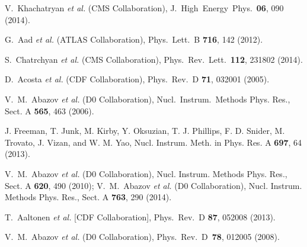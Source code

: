 \documentclass[aps,prl,twocolumn,showpacs,superscriptaddress,groupedaddress]{revtex4}  %
\begin{document}
\begin{thebibliography}{99}
  V.~Khachatryan {\it et al.}  (CMS Collaboration),
   J.\ High\ Energy\ Phys.\ {\bf 06}, 090 (2014).

   G.~Aad {\it et al.}  (ATLAS Collaboration),
  Phys.\ Lett.\ B {\bf 716}, 142 (2012).

  S.~Chatrchyan {\it et al.}  (CMS Collaboration),
  Phys.\ Rev.\ Lett.\  {\bf 112}, 231802 (2014).

  D.~Acosta {\it et al.}  (CDF Collaboration),
  Phys.\ Rev.\ D {\bf 71}, 032001 (2005).

  V.~M.~Abazov {\it et al.}  (D0 Collaboration),
  Nucl.\ Instrum.\ Methods Phys. Res., Sect. A {\bf 565}, 463 (2006).

J. Freeman, T. Junk, M. Kirby, Y. Oksuzian, T. J. Phillips,
F. D. Snider, M. Trovato, J. Vizan, and W. M. Yao,
Nucl. Instrum. Meth. in Phys. Res.
 A {\bf 697}, 64 (2013).

  V.~M.~Abazov {\it et al.} (D0 Collaboration),
  Nucl. Instrum. Methods Phys. Res., Sect. A {\bf 620}, 490 (2010);
  V.~M.~Abazov {\it et al.}  (D0 Collaboration),
  Nucl. Instrum. Methods Phys. Res., Sect. A {\bf 763}, 290 (2014).

  T.~Aaltonen {\it et al.}  [CDF Collaboration],
  Phys.\ Rev.\ D {\bf 87}, 052008 (2013).

V.~M.~Abazov {\it et al.} (D0 Collaboration),
Phys.\ Rev.\ D\ {\bf 78}, 012005 (2008).


\end{thebibliography}
\end{document}
